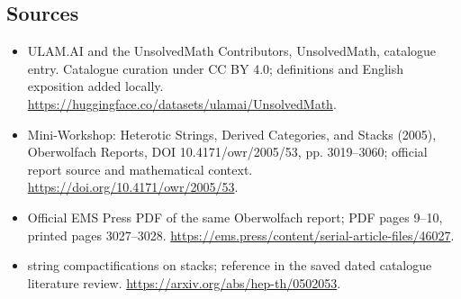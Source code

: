 \documentclass[11pt]{article}
\begin{document}
\subsection{Sources}
\begin{itemize}
\item[\hypertarget{source:statement:1}{S1}] ULAM.AI and the UnsolvedMath Contributors, UnsolvedMath, catalogue entry. Catalogue curation under CC BY 4.0; definitions and English exposition added locally.
\url{https://huggingface.co/datasets/ulamai/UnsolvedMath}.
\item[\hypertarget{source:statement:2}{S2}] Mini-Workshop: Heterotic Strings, Derived Categories, and Stacks (2005), Oberwolfach Reports, DOI 10.4171/owr/2005/53, pp. 3019--3060; official report source and mathematical context.
\url{https://doi.org/10.4171/owr/2005/53}.
\item[\hypertarget{source:statement:3}{S3}] Official EMS Press PDF of the same Oberwolfach report; PDF pages 9--10, printed pages 3027--3028.
\url{https://ems.press/content/serial-article-files/46027}.
\item[\hypertarget{source:statement:4}{S4}] string compactifications on stacks; reference in the saved dated catalogue literature review.
\url{https://arxiv.org/abs/hep-th/0502053}.
\end{itemize}
\label{end:statement}
\end{document}

